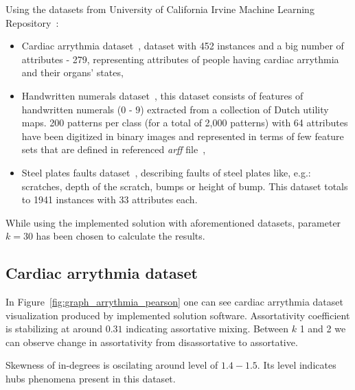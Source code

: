 Using the datasets from University of California Irvine Machine Learning Repository~\cite{uci_datasets}:

\begin{itemize}
\item Cardiac arrythmia dataset~\cite{dataset_cardiac_arythmia}, dataset with 452 instances and a big number of attributes - 279, representing attributes of people having cardiac arrythmia and their organs' states,
\item Handwritten numerals dataset~\cite{dataset_handwritten_numerals}, this dataset consists of features of handwritten numerals ($0$ - $9$) extracted from a collection of Dutch utility maps. 200 patterns per class (for a total of 2,000 patterns) with 64 attributes have been digitized in  binary images and represented in terms of few feature sets that are defined in referenced \emph{arff} file~\cite{dataset_handwritten_numerals},
\item Steel plates faults dataset~\cite{dataset_steel_plates_faults}, describing faults of steel plates like, e.g.: scratches, depth of the scratch, bumps or height of bump. This dataset totals to 1941 instances with 33 attributes each.
\end{itemize}

While using the implemented solution with aforementioned datasets, parameter $k = 30$ has been chosen to calculate the results.

\subsection{Cardiac arrythmia dataset}
\label{subsec:cardiac}
In Figure~\ref{fig:graph_arrythmia_pearson} one can see cardiac arrythmia dataset visualization produced by implemented solution software.
Assortativity coefficient is stabilizing at around $0.31$ indicating assortative mixing.
Between $k$ 1 and 2 we can observe change in assortativity from disassortative to assortative.

Skewness of in-degrees is oscilating around level of $1.4 - 1.5$.
Its level indicates hubs phenomena present in this dataset.

